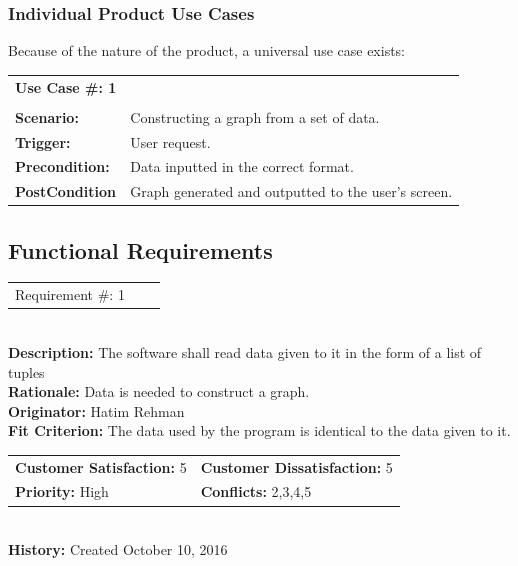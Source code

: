 \documentclass[12pt, titlepage]{article}
\begin{document}
\subsubsection{Individual Product Use Cases}

Because of the nature of the product, a universal use case exists: 

\begin{reqbox}
    \begin{tabular}{l p{10cm}}

	\bf{Use Case \#: 1} & \\
	 & \\
	{\bfseries Scenario: } 	& 	Constructing a graph from a set of data.	\\
	{\bfseries Trigger: }   		& 	User request. 					\\
	{\bfseries Precondition: } 	&	Data inputted in the correct format.		\\
	{\bfseries PostCondition } 	& 	Graph generated and outputted to the user's screen.				\\

    \end{tabular}
\end{reqbox}


\subsection{Functional Requirements}

\begin{reqbox}
\begin{tabular}{ccc}Requirement \#: 1
\end{tabular} \\
\textbf{Description:} The software shall read data given to it in the form of a list of tuples\\
\textbf{Rationale:} Data is needed to construct a graph. \\
\textbf{Originator:} Hatim Rehman \\
\textbf{Fit Criterion:} The data used by the program is identical to the data given to it.\\
\begin{tabular}{ll}
\textbf{Customer Satisfaction:} 5 & \textbf{Customer Dissatisfaction:} 5 \\
\textbf{Priority:} High & \textbf{Conflicts:} 2,3,4,5\\
\end{tabular} \\
\textbf{History:} Created October 10, 2016
\end{reqbox}
\end{document}
